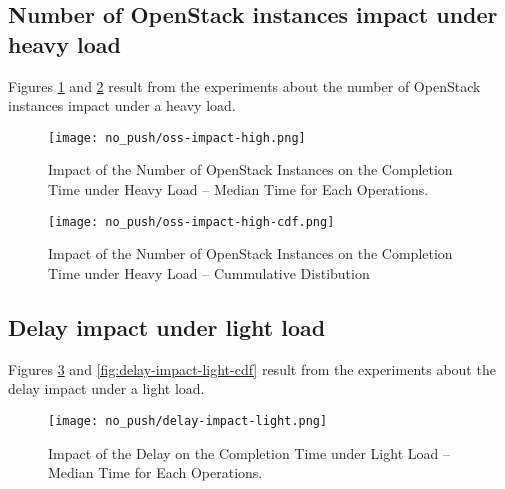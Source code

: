 \subsection{Number of OpenStack instances impact under heavy load}

Figures \ref{fig:oss-impact-high} and \ref{fig:oss-impact-high-cdf} result from the experiments about the number of OpenStack instances impact under a heavy load.


\begin{figure}[h]
  \centering
  \centerline{\texttt{[image: no\_push/oss-impact-high.png]}}
  \caption{Impact of the Number of OpenStack Instances on the Completion Time under Heavy Load – Median Time for Each Operations.}
  \label{fig:oss-impact-high}
\end{figure}


\begin{figure}[h]
  \centering
  \centerline{\texttt{[image: no\_push/oss-impact-high-cdf.png]}}
  \caption{Impact of the Number of OpenStack Instances on the Completion Time under Heavy Load – Cummulative Distibution}
  \label{fig:oss-impact-high-cdf}
\end{figure}

\subsection{Delay impact under light load}

Figures \ref{fig:delay-impact-light} and \ref{fig:delay-impact-light-cdf} result from the experiments about the delay impact under a light load.

\begin{figure}[h]
  \centering
  \centerline{\texttt{[image: no\_push/delay-impact-light.png]}}
  \caption{Impact of the Delay on the Completion Time under Light Load – Median Time for Each Operations.}
  \label{fig:delay-impact-light}
\end{figure}

